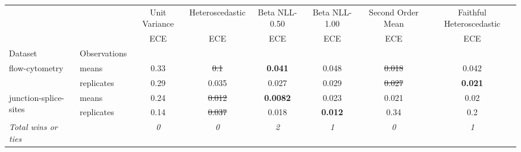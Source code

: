 \begin{tabular}{ll|c|c|c|c|c|c}
\toprule
{} & {} & {Unit Variance} & {Heteroscedastic} & {Beta NLL-0.50} & {Beta NLL-1.00} & {Second Order Mean} & {Faithful Heteroscedastic} \\
{} & {} & {ECE} & {ECE} & {ECE} & {ECE} & {ECE} & {ECE} \\
{Dataset} & {Observations} & {} & {} & {} & {} & {} & {} \\
\midrule
\multirow[c]{2}{*}{flow-cytometry} & means & 0.33 & \sout{0.1} & \textbf{0.041} & 0.048 & \sout{0.018} & 0.042 \\
 & replicates & 0.29 & 0.035 & 0.027 & 0.029 & \sout{0.027} & \textbf{0.021} \\
\multirow[c]{2}{*}{junction-splice-sites} & means & 0.24 & \sout{0.012} & \textbf{0.0082} & 0.023 & 0.021 & 0.02 \\
 & replicates & 0.14 & \sout{0.037} & 0.018 & \textbf{0.012} & 0.34 & 0.2 \\
\textit{{Total wins or ties}} &  & \textit{0} & \textit{0} & \textit{2} & \textit{1} & \textit{0} & \textit{1} \\
\bottomrule
\end{tabular}
